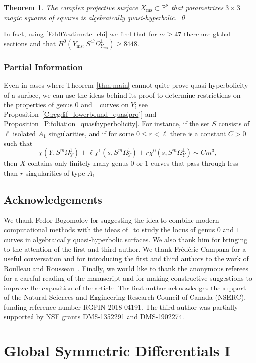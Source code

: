 \documentclass[12pt, reqno]{amsart}
\newtheorem{thm}[lemma]{Theorem}
\theoremstyle{definition}
\newcommand{\PP}{{\mathbb P}}
\newcommand{\Xms}{X_\mathrm{ms}}
\newcommand{\Yms}{Y_\mathrm{ms}}
\numberwithin{equation}{section}
\numberwithin{table}{section}
\begin{document}
\begin{thm}
\label{thm:magicsquares}
The complex projective surface $\Xms\subset \PP^8$ that parametrizes $3\times 3$ magic squares of squares is algebraically quasi-hyperbolic. 
\qed
\end{thm}
In fact, using \eqref{E:h0Yestimate_chi} we find that for $m\geq 47$ there are global sections and that $H^0(\Yms,S^{47}\Omega^1_{\Yms})\geq8448$.

\subsubsection{Partial Information}
Even in cases where Theorem~\ref{thm:main} cannot quite prove quasi-hyperbolicity of a surface, we can use the ideas behind its proof to determine restrictions on the properties of genus $0$ and $1$ curves on $Y$; see Proposition~\ref{C:regdif_lowerbound_quasiproj} and Proposition~\ref{P:foliation_quasihyperbolicity}.  For instance, if the set $S$ consists of $\ell$ isolated $A_1$ singularities, and if for some $0\leq r<\ell$ there is a constant $C>0$ such that
\[\chi(Y,S^m\Omega^1_Y)+\ell\chi^1(s,S^m\Omega^1_Y)+r\chi^0(s,S^m\Omega^1_Y)\sim Cm^3,
\]
then $X$ contains only finitely many genus $0$ or $1$ curves that pass through less than $r$ singularities of type $A_1$.

\subsection*{Acknowledgements} We thank Fedor Bogomolov for 
suggesting the idea to combine modern computational methods with the ideas of~\cite{BO} to study the locus of genus $0$ and $1$ curves in algebraically quasi-hyperbolic surfaces.  We also thank him for bringing \cite{Thomas} to the attention of the first and third author.  We thank Fr\'ed\'eric Campana for a useful conversation and for introducing the first and third authors to the work of Roulleau and Rousseau~\cite{RoulleauRousseau}. Finally, we would like to thank the anonymous referees for a careful reading of the manuscript and for making constructive suggestions to improve the exposition of the article. The first author acknowledges the support of the Natural Sciences and Engineering Research Council of Canada (NSERC), funding reference number RGPIN-2018-04191. The third author was partially supported by NSF grants DMS-1352291 and DMS-1902274.


\section{Global Symmetric Differentials I}
\label{S:GlobalSymmetricDifferentials-I}
\end{document}
